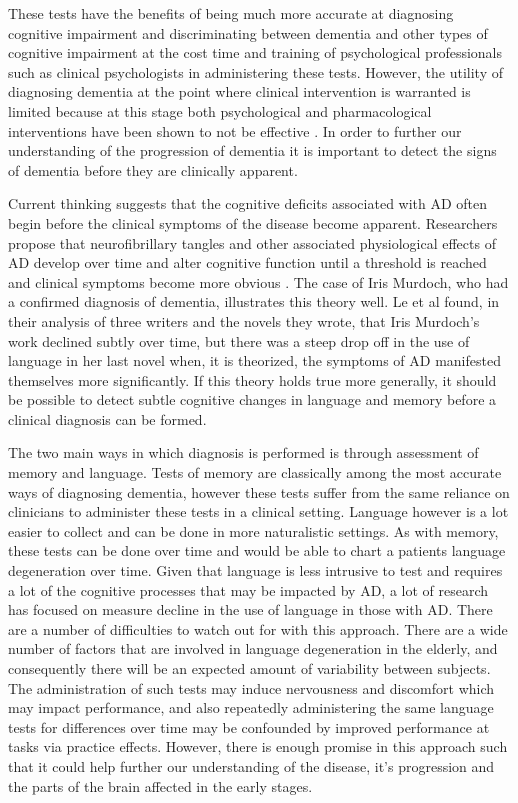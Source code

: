 \documentclass[10pt, letterpaper, twoside, openany]{thesis}
\begin{document}
\par 
These tests have the benefits of being much more accurate at diagnosing cognitive impairment and discriminating between dementia and other types of cognitive impairment at the cost time and training of psychological professionals such as clinical psychologists in administering these tests. However, the utility of diagnosing dementia at the point where clinical intervention is warranted is limited because at this stage both psychological and pharmacological interventions have been shown to not be effective \cite{Prince2015, Cummings2014}. In order to further our understanding of the progression of dementia it is important to detect the signs of dementia before they are clinically apparent.  
\par 
Current thinking suggests that the cognitive deficits associated with AD often begin before the clinical symptoms of the disease become apparent. Researchers propose that neurofibrillary tangles and other associated physiological effects of AD develop over time and alter cognitive function until a threshold is reached and clinical symptoms become more obvious \cite{Nestor2006}. The case of Iris Murdoch, who had a confirmed diagnosis of dementia, illustrates this theory well. Le et al \cite{Le2011} found, in their analysis of three writers and the novels they wrote, that Iris Murdoch's work declined subtly over time, but there was a steep drop off in the use of language in her last novel when, it is theorized, the symptoms of AD manifested themselves more significantly. If this theory holds true more generally, it should be possible to detect subtle cognitive changes in language and memory before a clinical diagnosis can be formed.
\par
The two main ways in which diagnosis is performed is through assessment of memory and language. Tests of memory are classically among the most accurate ways of diagnosing dementia, however these tests suffer from the same reliance on clinicians to administer these tests in a clinical setting. Language however is a lot easier to collect and can be done in more naturalistic settings. As with memory, these tests can be done over time and would be able to chart a patients language degeneration over time. Given that language is less intrusive to test and requires a lot of the cognitive processes that may be impacted by AD, a lot of research has focused on measure decline in the use of language in those with AD. There are a number of difficulties to watch out for with this approach. There are a wide number of factors that are involved in language degeneration in the elderly, and consequently there will be an expected amount of variability between subjects. The administration of such tests may induce nervousness and discomfort which may impact performance, and also repeatedly administering the same language tests for differences over time may be confounded by improved performance at tasks via practice effects. However, there is enough promise in this approach such that it could help further our understanding of the disease, it's progression and the parts of the brain affected in the early stages.
\end{document}
